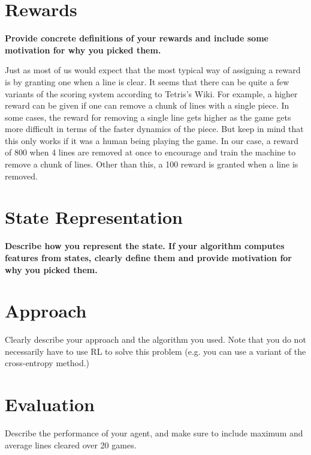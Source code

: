 \documentclass[12pt,letterpaper]{article}
\begin{document}
\section{Rewards}
\textbf{Provide concrete definitions of your rewards and include some motivation for why you picked them.}

Just as most of us would expect that the most typical way of assigning a reward is by granting one when a line is clear. It seems that there can be quite a few variants of the scoring system according to Tetris's Wiki. For example, a higher reward can be given if one can remove a chunk of lines with a single piece. In some cases, the reward for removing a single line gets higher as the game gets more difficult in terms of the faster dynamics of the piece. But keep in mind that this only works if it was a human being playing the game. In our case, a reward of 800 when 4 lines are removed at once to encourage and train the machine to remove a chunk of lines. Other than this, a 100 reward is granted when a line is removed.

\section{State Representation}
\textbf{Describe how you represent the state. If your algorithm computes features from states, clearly define them and provide motivation for why you picked them.}  

\section{Approach}
Clearly describe your approach and the algorithm you used. Note that you do not necessarily have to use RL to solve this problem (e.g. you can use a variant of the cross-entropy method.)

\section{Evaluation}
Describe the performance of your agent, and make sure to include maximum and average lines cleared over 20 games.
\end{document}
